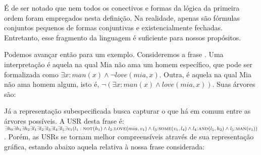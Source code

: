 É de ser notado que nem todos os conectivos e formas da lógica da primeira ordem foram empregados nesta definição. Na realidade, apenas são fórmulas conjuntos pequenos de formas conjuntivas e existencialmente fechadas. Entretanto, esse fragmento da linguagem é suficiente para nossos propósitos. \cite[p.~131]{BlackburnBos:2005}

Podemos avançar então para um exemplo. Consideremos a frase . Uma interpretação é aquela na qual Mia não ama um homem específico, que pode ser formalizada como $\exists x: man(x) \land \neg love(mia,x)$. Outra, é aquela na qual Mia não ama homem algum, isto é, $\neg (\exists x: man(x) \land love(mia,x))$. Suas árvores são:

\begin{center}
\end{center}

Já a representação subespecificada busca capturar o que há em comum entre as árvores possíveis. A USR desta frase é: $\exists h_0 \exists h_1 \exists h_2 \exists l_1 \exists l_2 \exists l_3 \exists l_4 \exists l_5 \exists v_1 ({l_1:\textsc{not}(h_1)} \land l_2\textsc{:love}(mia,v_1) \land l_3\textsc{:some}(v_1,l_4) \land l_4\textsc{:and}(l_5, h_2) \land l_5\textsc{:man}(v_1))$. Porém, as USRs se tornam melhor compreensíveis através de sua representação gráfica, estando abaixo aquela relativa à nossa frase considerada:

\begin{center}
\end{center}


